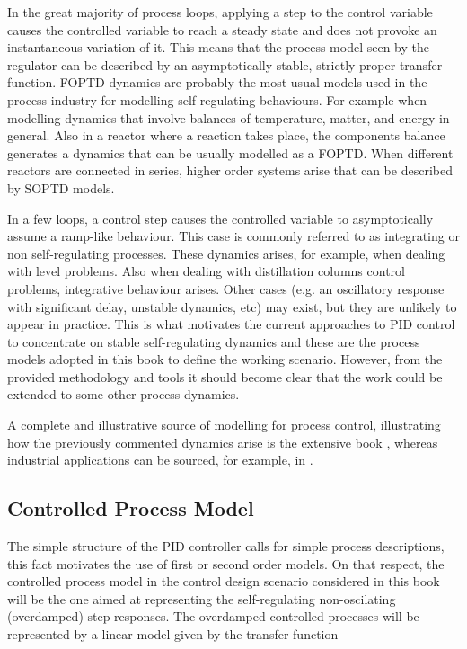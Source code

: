 In the great majority of process loops, applying a step to the control variable causes the controlled variable to reach a steady state and does not provoke an instantaneous variation of it. This means that the process model seen by the regulator can be described by an asymptotically stable, strictly proper transfer function. FOPTD dynamics are probably the most usual models used in the process industry for modelling self-regulating behaviours. For example when modelling dynamics that involve balances of temperature, matter, and energy in general. Also in a reactor where a reaction takes place, the components balance generates a dynamics that can be usually modelled as a FOPTD. When different reactors are connected in series, higher order systems arise that can be described by SOPTD models. 

In a few loops, a control step causes the controlled variable to asymptotically assume a ramp-like behaviour. This case is commonly referred to as  integrating or non self-regulating processes. These dynamics arises, for example, when dealing with level problems. Also when dealing with distillation columns control problems, integrative behaviour arises. Other cases (e.g. an oscillatory response with significant delay, unstable dynamics, etc) may exist, but they are unlikely to appear in practice. This is what motivates the current approaches to PID control to concentrate on stable self-regulating dynamics and these are the process models adopted in this book to define the working scenario. However, from the provided methodology and tools it should become clear that the work could be extended to some other process dynamics.

A complete and illustrative source of modelling for process control, illustrating how the previously commented dynamics arise is the extensive book \citep{MarlinBook}, whereas industrial applications can be sourced, for example, in  \citep{VilanovaBook2012}.


\subsection{Controlled Process Model}
\label{sec:2.1}

The simple structure of the PID controller calls for simple process descriptions, this fact motivates the use of first or second order models. On that respect, the controlled process model in the control design scenario considered in this book will be the one aimed at representing the self-regulating non-oscilating (overdamped) step responses. The overdamped controlled processes will be represented by a linear model given by the transfer function

